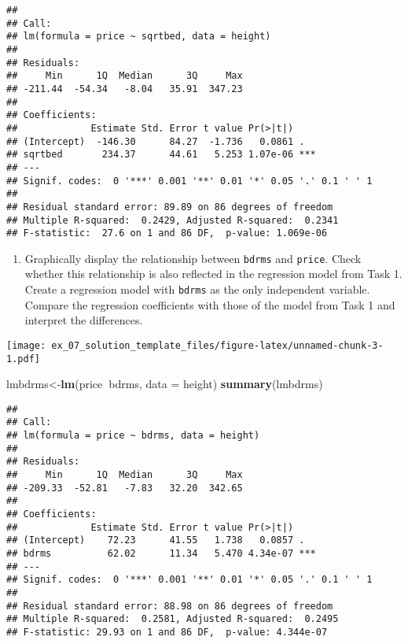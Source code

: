 \documentclass[11pt,]{article}
\newenvironment{Shaded}{\begin{snugshade}}{\end{snugshade}}
\newcommand{\CommentTok}[1]{\textcolor[rgb]{0.56,0.35,0.01}{\textit{#1}}}
\newcommand{\DataTypeTok}[1]{\textcolor[rgb]{0.13,0.29,0.53}{#1}}
\newcommand{\KeywordTok}[1]{\textcolor[rgb]{0.13,0.29,0.53}{\textbf{#1}}}
\newcommand{\NormalTok}[1]{#1}
\newcommand{\OperatorTok}[1]{\textcolor[rgb]{0.81,0.36,0.00}{\textbf{#1}}}
\newcommand{\StringTok}[1]{\textcolor[rgb]{0.31,0.60,0.02}{#1}}
\providecommand{\tightlist}{%
  \setlength{\itemsep}{0pt}\setlength{\parskip}{0pt}}
\begin{document}
\begin{verbatim}
## 
## Call:
## lm(formula = price ~ sqrtbed, data = height)
## 
## Residuals:
##     Min      1Q  Median      3Q     Max 
## -211.44  -54.34   -8.04   35.91  347.23 
## 
## Coefficients:
##             Estimate Std. Error t value Pr(>|t|)    
## (Intercept)  -146.30      84.27  -1.736   0.0861 .  
## sqrtbed       234.37      44.61   5.253 1.07e-06 ***
## ---
## Signif. codes:  0 '***' 0.001 '**' 0.01 '*' 0.05 '.' 0.1 ' ' 1
## 
## Residual standard error: 89.89 on 86 degrees of freedom
## Multiple R-squared:  0.2429, Adjusted R-squared:  0.2341 
## F-statistic:  27.6 on 1 and 86 DF,  p-value: 1.069e-06
\end{verbatim}

\begin{enumerate}
\def\labelenumi{\arabic{enumi}.}
\setcounter{enumi}{2}
\tightlist
\item
  Graphically display the relationship between \texttt{bdrms} and
  \texttt{price}. Check whether this relationship is also reflected in
  the regression model from Task 1. Create a regression model with
  \texttt{bdrms} as the only independent variable. Compare the
  regression coefficients with those of the model from Task 1 and
  interpret the differences.
\end{enumerate}

\begin{Shaded}
\end{Shaded}

\texttt{[image: ex\_07\_solution\_template\_files/figure-latex/unnamed-chunk-3-1.pdf]}

\begin{Shaded}
\begin{Highlighting}[]
\NormalTok{lmbdrms<-}\KeywordTok{lm}\NormalTok{(price}\OperatorTok{~}\NormalTok{bdrms, }\DataTypeTok{data =}\NormalTok{ height)}
\KeywordTok{summary}\NormalTok{(lmbdrms)}
\end{Highlighting}
\end{Shaded}

\begin{verbatim}
## 
## Call:
## lm(formula = price ~ bdrms, data = height)
## 
## Residuals:
##     Min      1Q  Median      3Q     Max 
## -209.33  -52.81   -7.83   32.20  342.65 
## 
## Coefficients:
##             Estimate Std. Error t value Pr(>|t|)    
## (Intercept)    72.23      41.55   1.738   0.0857 .  
## bdrms          62.02      11.34   5.470 4.34e-07 ***
## ---
## Signif. codes:  0 '***' 0.001 '**' 0.01 '*' 0.05 '.' 0.1 ' ' 1
## 
## Residual standard error: 88.98 on 86 degrees of freedom
## Multiple R-squared:  0.2581, Adjusted R-squared:  0.2495 
## F-statistic: 29.93 on 1 and 86 DF,  p-value: 4.344e-07
\end{verbatim}
\end{document}
